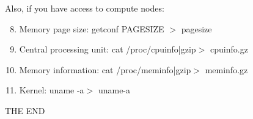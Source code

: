 \documentclass{article}
\begin{document}
\noindent
Also, if you have access to compute nodes:

\begin{enumerate}
\setcounter{enumi}{7}
   \item Memory page size: getconf PAGESIZE $>$ pagesize
   \item Central processing unit: cat /proc/cpuinfo|gzip$>$ cpuinfo.gz
   \item Memory information: cat /proc/meminfo|gzip$>$ meminfo.gz
   \item Kernel: uname -a$>$ uname-a 
\end{enumerate}


THE END
\end{document}
